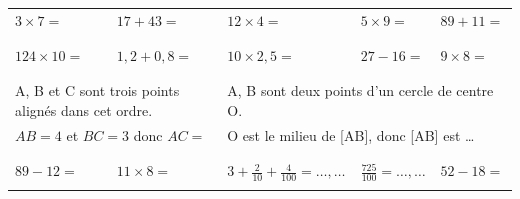 \documentclass[14]{article}
\begin{document}
    \begin{tabular}{p{3cm}|p{3cm}|p{3cm}|p{3cm}|p{3cm}}
         $3\times7=$ & $17+43=$ & $12\times 4 = $ & $5\times9=$ & $89+11=$\\ 
         
         & & & &\\ \hline & & & &\\
         
         $124\times 10=$ & $1,2+0,8=$ & $10\times2,5=$ &  $27-16=$ & $9\times8=$\\
         
         & & & &\\ \hline \multicolumn{2}{c|}{} & \multicolumn{2}{c}{}\\
         
         \multicolumn{2}{l|}{A, B et C sont trois points alignés dans cet ordre.} & 
         \multicolumn{3}{l}{A, B sont deux points d'un cercle de centre O.}\\
         
         \multicolumn{2}{l|}{$AB=4$ et $BC=3$ donc $AC=$} & 
         \multicolumn{3}{l}{O est le milieu de [AB], donc [AB] est \ldots}\\

        \multicolumn{2}{c|}{} & \multicolumn{2}{c}{} \\ \hline & & & &\\

        $89-12=$ & $11\times8=$ & $3+\frac{2}{10}+\frac{4}{100}= \ldots,\ldots$ & $ \frac{725}{100}=\ldots,\ldots$ & $52-18=$ \\

        & & & &\\ 
    \end{tabular}

\bigskip

\enteteActivite{\monTitre}{\theserie}
\end{document}
